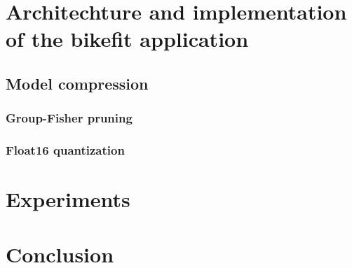 
\chapter{Architechture and implementation of the bikefit application}


\section{Model compression}

\subsection{Group-Fisher pruning}

\subsection{Float16 quantization}


\chapter{Experiments}


\chapter{Conclusion}
\label{zaver}




% 
